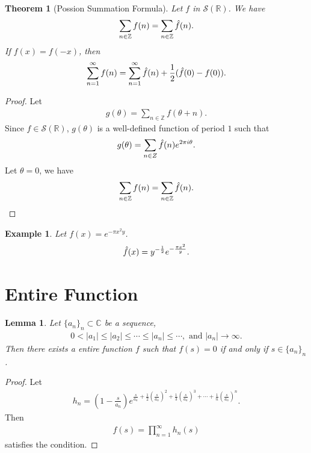 \documentclass[a4paper,10pt]{amsart}
\newtheorem{example}{Example}[section]
\newtheorem{theorem}{Theorem}[section]
\newtheorem{lemma}{Lemma}[section]
\newcommand{\SSS}{\mathcal S}
\newcommand{\C}{\mathbb C} %
\newcommand{\R}{\mathbb R}  %
\newcommand{\Z}{\mathbb Z} %
\begin{document}
\begin{theorem}[Possion Summation Formula]
    Let $f$ in $\SSS(\R)$. We have
    \begin{align*}
        \sum_{n \in \Z}f(n) = \sum_{n \in \Z} \Hat{f}(n).
    \end{align*}
    If $f(x) = f(-x)$, then
    \begin{align*}
        \sum^{\infty}_{n=1}f(n) = \sum^{\infty}_{n=1}\Hat{f}(n) +
        \frac{1}{2}(\Hat{f}(0)-f(0)).
    \end{align*}
\end{theorem}

\begin{proof}
    Let 
    \begin{align*}
        g(\theta) = \sum_{n \in \Z}f(\theta+n).
    \end{align*}
    Since $f \in \SSS(\R)$, $g(\theta)$ is a well-defined 
    function of period $1$ such that
    \begin{align*}
        g(\theta) = \sum_{n \in Z} \Hat{f}(n) e^{2\pi i \theta}.  
    \end{align*}
    Let $\theta = 0$, we have
    \begin{align*}
        \sum_{n \in \Z}f(n) = \sum_{n \in \Z} \Hat{f}(n).
    \end{align*}
\end{proof}

\begin{example}
    Let $f(x) = e^{-\pi x^2 y}$.
    \begin{align*}
        \Hat{f}(x)= y^{-\frac{1}{2}}e^{-\frac{\pi x^2}{y}}. 
    \end{align*}
\end{example}

\section{Entire Function}

\begin{lemma}
Let $\{a_{n}\}_{n} \subset \C$ be a sequence, 
\begin{align*}
    0 < |a_{1}| \leq |a_{2}| \leq \cdots \leq |a_{n}| \leq \cdots,
    \mbox{ and } |a_{n}| \rightarrow \infty.
\end{align*}
Then there exists a entire function $f$ such that $f(s) = 0$ if and 
only if $s \in \{a_{n}\}_{n}$.
\end{lemma}

\begin{proof}
   Let 
   \begin{align*}
       h_{n} = (1 - \frac{s}{a_n})e^{\frac{s}{a_{n}}
           +\frac{1}{2}(\frac{s}{a_{n}})^{2} 
            +\frac{1}{3}(\frac{s}{a_{n}})^{3} + \cdots
        +\frac{1}{n}(\frac{s}{a_{n}})^{n}}.
   \end{align*}
   Then
   \begin{align*}
       f(s) = \prod_{n=1}^{\infty}h_{n}(s)   
   \end{align*}
   satisfies the condition.
\end{proof}
\end{document}
